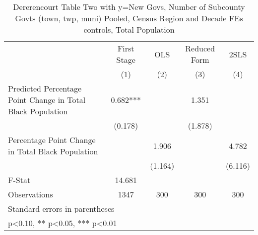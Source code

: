 \begin{table}[htbp]\centering
\def\sym#1{\ifmmode^{#1}\else\(^{#1}\)\fi}
\caption{Dererencourt Table Two with y=New Govs, Number of Subcounty Govts (town, twp, muni)  Pooled, Census Region and Decade FEs controls, Total Population}
\begin{tabular}{l*{4}{c}}
\toprule
                    & First Stage   &         OLS   &Reduced Form   &        2SLS   \\
                    &\multicolumn{1}{c}{(1)}   &\multicolumn{1}{c}{(2)}   &\multicolumn{1}{c}{(3)}   &\multicolumn{1}{c}{(4)}   \\
\midrule
Predicted Percentage Point Change in Total Black Population&       0.682***&               &       1.351   &               \\
                    &     (0.178)   &               &     (1.878)   &               \\
\addlinespace
Percentage Point Change in Total Black Population&               &       1.906   &               &       4.782   \\
                    &               &     (1.164)   &               &     (6.116)   \\
\midrule
F-Stat              &      14.681   &               &               &               \\
Observations        &        1347   &         300   &         300   &         300   \\
\bottomrule
\multicolumn{5}{l}{\footnotesize Standard errors in parentheses}\\
\multicolumn{5}{l}{\footnotesize * p<0.10, ** p<0.05, *** p<0.01}\\
\end{tabular}
\end{table}
